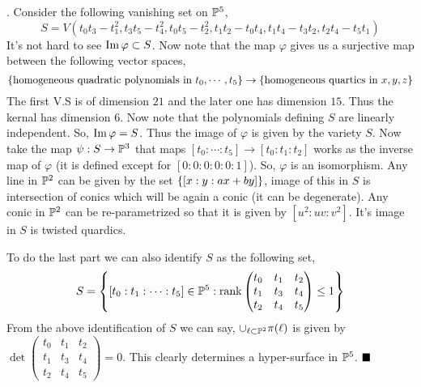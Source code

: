 \documentclass[12pt]{article}
\begin{document}
\sol. Consider the following vanishing set on $\mathbb{P}^5$, $$S = V(t_0t_3-t_1^2, t_3t_5-t_4^2,t_0t_5-t_2^2,t_1t_2-t_0t_4,t_1t_4-t_3t_2,t_2t_4-t_5t_1)$$
It's not hard to see $\operatorname{Im} \varphi \subset S$. Now note that the map $\varphi$ gives us a surjective map between the following vector spaces, \[
    \qty{\text{homogeneous quadratic polynomials in }t_0,\cdots,t_5} \to  \qty{\text{homogeneous quartics in } x,y,z}
\]
The first V.S is of dimension $21$ and the later one has dimension $15$. Thus the kernal has dimension $6$. Now note that the polynomials defining $S$ are linearly independent. So, $\operatorname{Im} \varphi = S$. Thus the image of $\varphi$ is given by the variety $S$. Now take the map $\psi : S \to \mathbb{P}^3$ that maps $[t_0:\cdots:t_5] \to [t_0:t_1:t_2]$ works as the inverse map of $\varphi$ (it is defined except for $[0:0:0:0:0:1]$). So, $\varphi$ is an isomorphism. Any line in $\mathbb{P}^2$ can be given by the set $\qty{[x:y:ax+by]}$, image of this in $S$ is intersection of conics which will be again a conic (it can be degenerate). Any conic in $\mathbb{P}^2$ can be re-parametrized so that it is given by $[u^2:uv:v^2]$. It's image in $S$ is twisted quardics.

\vspace*{0.2cm}

\noindent To do the last part we can also identify $S$ as the following set,\[S = \qty{ [t_0:t_1:\cdots:t_5] \in \mathbb{P}^5:\operatorname{rank }\begin{pmatrix}
            t_0 & t_1 & t_2 \\
            t_1 & t_3 & t_4 \\
            t_2 & t_4 & t_5
        \end{pmatrix} \leq 1}\] From the above identification of $S$ we can say, $\cup_{\ell \subset \mathbb{P}^2}\pi(\ell)$ is given by $\det \begin{pmatrix}
        t_0 & t_1 & t_2 \\
        t_1 & t_3 & t_4 \\
        t_2 & t_4 & t_5
    \end{pmatrix}=0$. This clearly determines a hyper-surface in $\mathbb{P}^5$. $\hfill \blacksquare$
\end{document}
